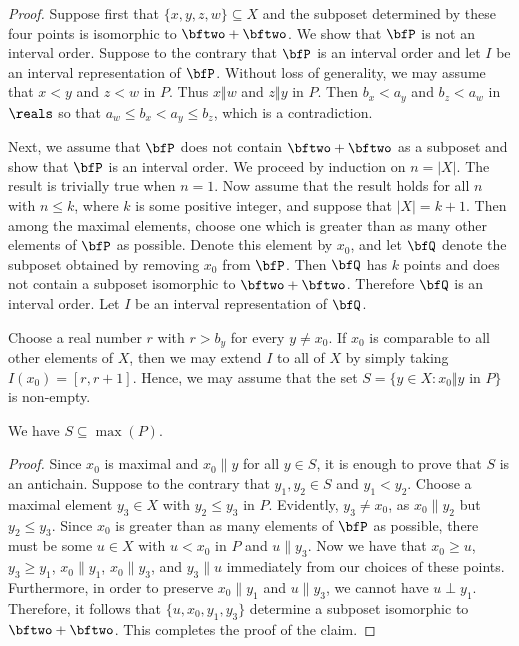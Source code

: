 \begin{proof}
Suppose first that $\{x,y,z,w\}\subseteq X$ and the subposet
determined by these four points is isomorphic to $\bftwo+\bftwo$.
We show that $\bfP$ is not an interval order.  Suppose to the
contrary that $\bfP$ is an interval order and let $I$ be
an interval representation of $\bfP$.  Without loss of generality, we
may assume that $x<y$ and $z<w$ in $P$.  Thus $x\Vert w$ and
$z\Vert y$ in $P$.  Then $b_x<a_y$ and $b_z < a_w$ in $\reals$ 
so that $a_w \le b_x <a_y \le b_z$, which is a contradiction.

Next, we assume that $\bfP$ does not contain $\bftwo+\bftwo$ as a
subposet and show that $\bfP$ is an interval order.  We proceed by
induction on $n=|X|$.  The result is trivially true when $n=1$.  Now
assume that the result holds for all $n$ with $n\le k$, where $k$ is
some positive integer, and suppose that $|X|=k+1$.  Then among the
maximal elements, choose one which is greater than as many other
elements of $\bfP$ as possible.  Denote this element by $x_0$, and let
$\bfQ$ denote the subposet obtained by removing $x_0$ from $\bfP$.
Then $\bfQ$ has $k$ points and does not contain a subposet isomorphic
to $\bftwo+\bftwo$.  Therefore $\bfQ$ is an interval order.  Let $I$
be an interval representation of $\bfQ$.

Choose a real number $r$ with $r > b_y$ for every $y\neq x_0$.  If
$x_0$ is comparable to all other elements of $X$, then we may extend
$I$ to all of $X$ by simply taking $I(x_0) = [r,r+1]$.  Hence, we may
assume that the set $S=\{y\in X:x_0\Vert y$ in $P\}$ is non-empty.

\begin{claim*}
We have $S\subseteq \max(P)$.
\end{claim*}

\textit{Proof.}  Since $x_0$ is maximal and $x_0\|y$ for all $y\in S$,
it is enough to prove that $S$ is an antichain. Suppose to the
contrary that $y_1,y_2\in S$ and $y_1<y_2$.  Choose a maximal element
$y_3\in X$ with $y_2\le y_3$ in $P$.  Evidently, $y_3\neq x_0$, as
$x_0\| y_2$ but $y_2\leq y_3$.  Since $x_0$ is greater than as many
elements of $\bfP$ as possible, there must be some $u\in X$ with $u<x_0$
in $P$ and $u\| y_3$.  Now we have that $x_0\geq u$, $y_3\geq y_1$,
$x_0\|y_1$, $x_0\| y_3$, and $y_3\| u$ immediately from our choices of
these points. Furthermore, in order to preserve $x_0\| y_1$ and
$u\|y_3$, we cannot have $u\perp y_1$. Therefore, it follows that
$\{u,x_0,y_1,y_3\}$ determine a subposet isomorphic to
$\bftwo+\bftwo$.  This completes the proof of the claim.


\end{proof}
